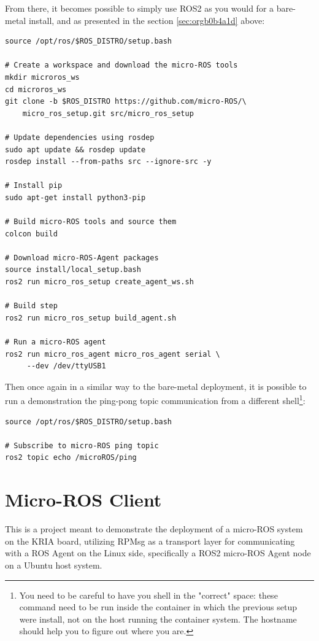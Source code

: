\documentclass[10pt]{article}
\begin{document}
From there, it becomes possible to simply use ROS2 as you would for a bare-metal install,
and as presented in the section \ref{sec:orgb0b4a1d} above:
\begin{verbatim}
source /opt/ros/$ROS_DISTRO/setup.bash

# Create a workspace and download the micro-ROS tools
mkdir microros_ws
cd microros_ws
git clone -b $ROS_DISTRO https://github.com/micro-ROS/\
    micro_ros_setup.git src/micro_ros_setup

# Update dependencies using rosdep
sudo apt update && rosdep update
rosdep install --from-paths src --ignore-src -y

# Install pip
sudo apt-get install python3-pip

# Build micro-ROS tools and source them
colcon build

# Download micro-ROS-Agent packages
source install/local_setup.bash
ros2 run micro_ros_setup create_agent_ws.sh

# Build step
ros2 run micro_ros_setup build_agent.sh

# Run a micro-ROS agent
ros2 run micro_ros_agent micro_ros_agent serial \
     --dev /dev/ttyUSB1
\end{verbatim}

Then once again in a similar way to the bare-metal deployment,  it is possible to run a demonstration
the ping-pong topic communication from a different shell\footnote{You need to be careful to have you shell in the "correct" space: these command need to be run inside
the container in which the previous setup were install, not on the host running the container system.
The hostname should help you to figure out where you are.}:
\begin{verbatim}
source /opt/ros/$ROS_DISTRO/setup.bash

# Subscribe to micro-ROS ping topic
ros2 topic echo /microROS/ping
\end{verbatim}
\clearpage
\section{Micro-ROS Client}
\label{sec:org46e0064}
This is a project meant to demonstrate the deployment of a micro-ROS system
on the KRIA board, utilizing RPMsg as a transport layer for communicating
with a ROS Agent on the Linux side, specifically a ROS2 micro-ROS Agent node
on a Ubuntu host system.
\end{document}
